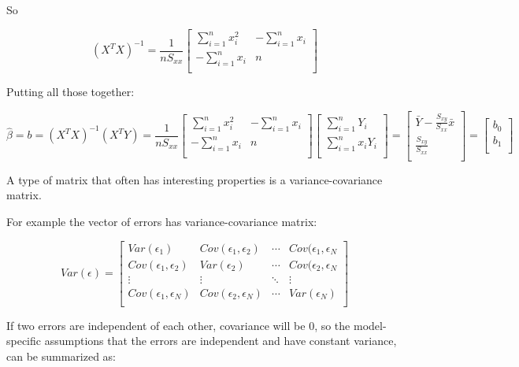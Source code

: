 \documentclass[a4paper, 11pt, twoside]{article}
\begin{document}
So

\[(X^TX)^{-1}=\frac1{nS_{xx}}
\begin{bmatrix}
	\sum\limits^n_{i=1}x_i^2 & -\sum\limits^n_{i=1}x_i \\
	-\sum\limits^n_{i=1}x_i & n\\	
\end{bmatrix}
\]

Putting all those together:

\[\hat{\beta} = b = (X^TX)^{-1}(X^TY)=\frac1{nS_{xx}}
\begin{bmatrix}
		\sum\limits^n_{i=1}x_i^2 & -\sum\limits^n_{i=1}x_i \\
	-\sum\limits^n_{i=1}x_i & n\\	
\end{bmatrix}
\begin{bmatrix}
	\sum\limits^n_{i=1}Y_i\\
	\sum\limits^n_{i=1}x_iY_i\\
\end{bmatrix}
=\begin{bmatrix}
	\bar{Y}-\frac{S_{xy}}{S_{xx}}\bar{x}\\
	\frac{S_{xy}}{S_{xx}}\\
\end{bmatrix}
=\begin{bmatrix}
	b_0\\b_1\\
\end{bmatrix}
\]

A type of matrix that often has interesting properties is a variance-covariance matrix.

For example the vector of errors has variance-covariance matrix:

\[Var(\epsilon)=
\begin{bmatrix}
	Var(\epsilon_1) & Cov(\epsilon_1, \epsilon_2) & \cdots & Cov(\epsilon_1, \epsilon_N\\
	Cov(\epsilon_1, \epsilon_2) & Var(\epsilon_2) & \cdots &	 Cov(\epsilon_2, \epsilon_N\\
	\vdots & \vdots & \ddots & \vdots \\
	Cov(\epsilon_1, \epsilon_N) & Cov(\epsilon_2, \epsilon_N) & \cdots & Var(\epsilon_N)\\
\end{bmatrix}
\]

If two errors are independent of each other, covariance will be $0$, so the model-specific  assumptions that the errors are independent and have constant variance, can be summarized as:
\end{document}
